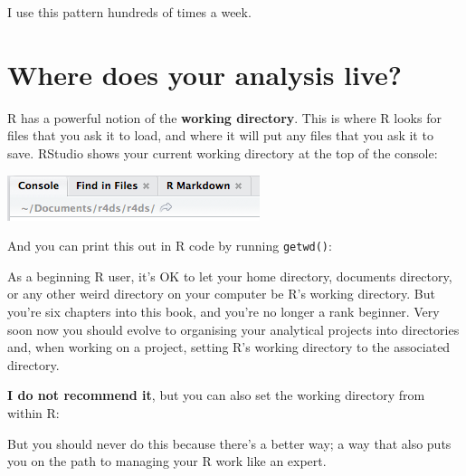 \documentclass[letterpaper,12pt,twoside,]{pinp}
\begin{document}
I use this pattern hundreds of times a week.

\newpage

\hypertarget{where-does-your-analysis-live}{%
\section{Where does your analysis
live?}\label{where-does-your-analysis-live}}

R has a powerful notion of the \textbf{working directory}. This is where
R looks for files that you ask it to load, and where it will put any
files that you ask it to save. RStudio shows your current working
directory at the top of the console:

\begin{center}\includegraphics[width=0.5\linewidth]{screenshots/rstudio-wd} \end{center}

And you can print this out in R code by running \texttt{getwd()}:

\begin{Shaded}
\begin{Highlighting}[]
\NormalTok{()}
\end{Highlighting}
\end{Shaded}

As a beginning R user, it's OK to let your home directory, documents
directory, or any other weird directory on your computer be R's working
directory. But you're six chapters into this book, and you're no longer
a rank beginner. Very soon now you should evolve to organising your
analytical projects into directories and, when working on a project,
setting R's working directory to the associated directory.

\textbf{I do not recommend it}, but you can also set the working
directory from within R:

\begin{Shaded}
\begin{Highlighting}[]
\NormalTok{(}\NormalTok{)}
\end{Highlighting}
\end{Shaded}

But you should never do this because there's a better way; a way that
also puts you on the path to managing your R work like an expert.
\end{document}
